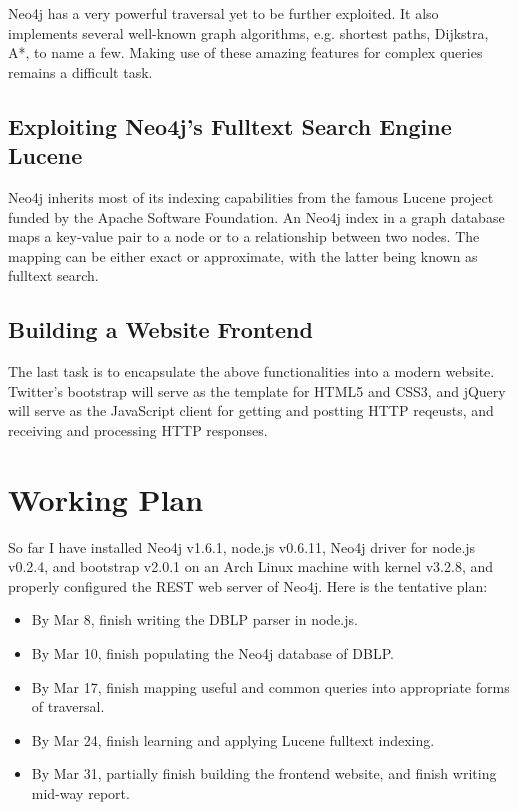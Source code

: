 \documentclass[10pt, conference, compsocconf]{IEEEtran}
\begin{document}
Neo4j has a very powerful traversal yet to be further exploited. It also implements several well-known graph algorithms, e.g. shortest paths, Dijkstra, A*, to name a few. Making use of these amazing features for complex queries remains a difficult task.

\subsection{Exploiting Neo4j's Fulltext Search Engine Lucene}

Neo4j inherits most of its indexing capabilities from the famous Lucene project funded by the Apache Software Foundation. An Neo4j index in a graph database maps a key-value pair to a node or to a relationship between two nodes. The mapping can be either exact or approximate, with the latter being known as fulltext search.

\subsection{Building a Website Frontend}

The last task is to encapsulate the above functionalities into a modern website. Twitter's bootstrap will serve as the template for HTML5 and CSS3, and jQuery will serve as the JavaScript client for getting and postting HTTP reqeusts, and receiving and processing HTTP responses.

\section{Working Plan}

So far I have installed Neo4j v1.6.1, node.js v0.6.11, Neo4j driver for node.js v0.2.4, and bootstrap v2.0.1 on an Arch Linux machine with kernel v3.2.8, and properly configured the REST web server of Neo4j. Here is the tentative plan:

\begin{itemize}
\item By Mar 8, finish writing the DBLP parser in node.js.
\item By Mar 10, finish populating the Neo4j database of DBLP.
\item By Mar 17, finish mapping useful and common queries into appropriate forms of traversal.
\item By Mar 24, finish learning and applying Lucene fulltext indexing.
\item By Mar 31, partially finish building the frontend website, and finish writing mid-way report.
\end{itemize}
\end{document}
